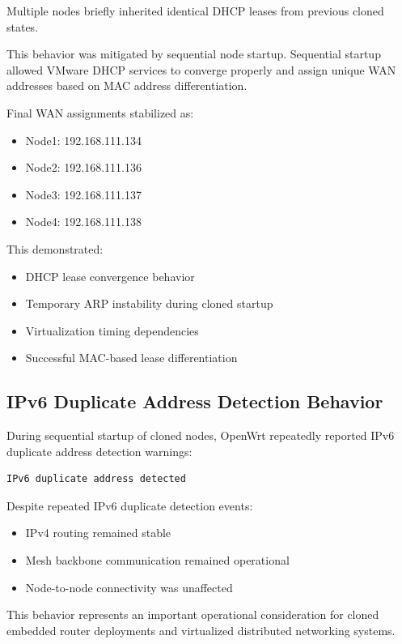 \documentclass[conference]{IEEEtran}
\begin{document}
Multiple nodes briefly inherited identical DHCP leases from previous cloned states.

This behavior was mitigated by sequential node startup. Sequential startup allowed VMware DHCP services to converge properly and assign unique WAN addresses based on MAC address differentiation.

Final WAN assignments stabilized as:

\begin{itemize}
    \item Node1: 192.168.111.134
    \item Node2: 192.168.111.136
    \item Node3: 192.168.111.137
    \item Node4: 192.168.111.138
\end{itemize}

This demonstrated:

\begin{itemize}
    \item DHCP lease convergence behavior
    \item Temporary ARP instability during cloned startup
    \item Virtualization timing dependencies
    \item Successful MAC-based lease differentiation
\end{itemize}

\subsection{IPv6 Duplicate Address Detection Behavior}

During sequential startup of cloned nodes, OpenWrt repeatedly reported IPv6 duplicate address detection warnings:

\begin{verbatim}
IPv6 duplicate address detected
\end{verbatim}

Despite repeated IPv6 duplicate detection events:

\begin{itemize}
    \item IPv4 routing remained stable
    \item Mesh backbone communication remained operational
    \item Node-to-node connectivity was unaffected
\end{itemize}

This behavior represents an important operational consideration for cloned embedded router deployments and virtualized distributed networking systems.
\end{document}
